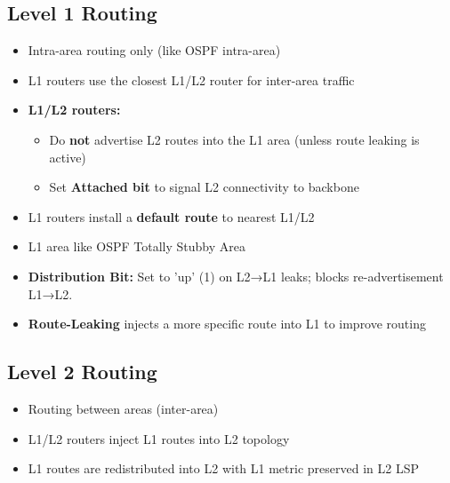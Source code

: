 \begin{multicols*}{5}
		\subsection{Level 1 Routing}
		\begin{itemize}
			\item Intra-area routing only (like OSPF intra-area)
			\item L1 routers use the closest L1/L2 router for inter-area traffic
			\item \textbf{L1/L2 routers:}
			\begin{itemize}
				\item Do \textbf{not} advertise L2 routes into the L1 area (unless route leaking is active)
				\item Set \textbf{Attached bit} to signal L2 connectivity to backbone
			\end{itemize}
			\item L1 routers install a \textbf{default route} to nearest L1/L2
			\item L1 area like OSPF Totally Stubby Area
			\item \textbf{Distribution Bit:} Set to 'up' (1) on L2→L1 leaks; blocks re-advertisement L1→L2.
			\item \textbf{Route-Leaking} injects a more specific route into L1 to improve routing
		\end{itemize}
		
		\subsection{Level 2 Routing}
		\begin{itemize}
			\item Routing between areas (inter-area)
			\item L1/L2 routers inject L1 routes into L2 topology
			\item L1 routes are redistributed into L2 with L1 metric preserved in L2 LSP
		\end{itemize}

\end{multicols*}
